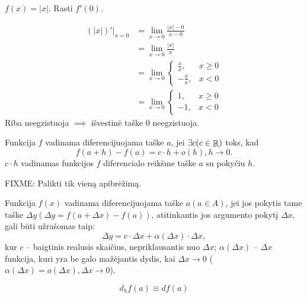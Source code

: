 \begin{exmp}
  $f(x) = |x|$. Rasti $f'(0)$.

  \begin{align*}
    (|x|)'|_{x = 0} 
    &= \lim _{x \to 0} \frac{|x| - 0}{x - 0} \\
    &= \lim _{x \to 0} \frac{|x|}{x} \\
    &= \lim _{x \to 0}
    \begin{cases}
      \frac{x}{x}, & x \geq 0 \\
      -\frac{x}{x}, & x < 0
    \end{cases} \\
    &= \lim _{x \to 0}
    \begin{cases}
      1, & x \geq 0 \\
      -1, & x < 0
    \end{cases}
  \end{align*}
  Riba neegzistuoja $\implies$ išvestinė taške 0 neegzistuoja.
\end{exmp}

\begin{defn}
  Funkcija $f$ vadinama diferencijuojama taške $a$, jei 
  $\exists c (c \in \mathop{\mathbb{R}})$ toks, kad 
  \begin{equation*}
    f(a + h) - f(a) = c \cdot h + o(h), h \to 0.
  \end{equation*}
  $c \cdot h$ vadinamas funkcijos $f$ diferencialo reikšme taške $a$
  su pokyčiu $h$.
\end{defn}

\begin{defn}
  FIXME: Palikti tik vieną apibrėžimą.

  Funkcija $f(x)$ vadinama diferencijuojama taške $a (a \in A)$, jei 
  jos pokytis tame taške $\Delta y (\Delta y = f(a + \Delta x) - f(a))$, 
  atitinkantis jos argumento pokytį $\Delta x$, gali būti užrašomas taip:
  \begin{equation*}
    \Delta y = c \cdot \Delta x + \alpha (\Delta x) \cdot \Delta x,
  \end{equation*}
  kur $c$ – baigtinis realusis skaičius, nepriklausantis nuo $\Delta x$;
  $\alpha(\Delta x)$ – $\Delta x$ funkcija, kuri yra be galo mažėjantis
  dydis, kai $\Delta x \to 0$ 
  ($\alpha(\Delta x) = o(\Delta x), \Delta x \to 0$).
\end{defn}

\begin{notation}
  \begin{equation*}
    d_{h} f(a) \equiv d f(a)
  \end{equation*}
\end{notation}

